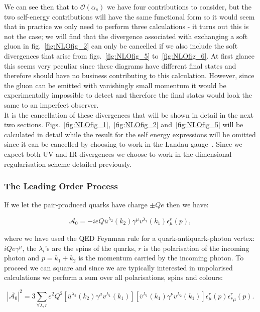 		We can see then that to $\mathcal{O}(\alpha_s)$ we have four contributions to consider, but the two self-energy contributions will have
		the same functional form so it would seem that in practice we only need to perform three calculations - it turns out this is not the
		case; we will find that the divergence associated with exchanging a soft gluon in fig.~\eqref{fig:NLOfig_2} can only be cancelled
		if we also include the soft divergences that arise from figs.~\eqref{fig:NLOfig_5} to~\eqref{fig:NLOfig_6}.  At first glance this
		seems very peculiar since these diagrams have different final states and therefore should have no business contributing to this
		calculation.  However, since the gluon can be emitted with vanishingly small momentum it would be experimentally impossible to
		detect and therefore the final states would look the same to an imperfect observer.\\It is the cancellation of these divergences
		that will be shown in detail in the next two sections.  Figs.~\eqref{fig:NLOfig_1},~\eqref{fig:NLOfig_2} and~\eqref{fig:NLOfig_5}
		will be calculated in detail while the result for the self energy expressions will be omitted since it can be cancelled by
		choosing to work in the Landau gauge~\cite{fieldBook}.  Since we expect both UV and IR divergences we choose to work in the dimensional
		regularisation scheme detailed previously.

		\subsubsection{The Leading Order Process}

			If we let the pair-produced quarks have charge $\pm Qe$ then we have:

			\begin{equation}
				\mathcal{A}_0 = -ieQ\overline{u}^{\lambda_2}(k_2)\gamma^\mu v^{\lambda_1}(k_1)\epsilon^r_\mu(p),
			\end{equation}

			where we have used the QED Feynman rule for a quark-antiquark-photon vertex: $iQe\gamma^\mu$, the $\lambda_i$'s are the
			spins of the quarks, $r$ is the polarisation of the incoming photon and $p = k_1 + k_2$ is the momentum carried by the
			incoming photon.  To proceed we can square and since we are typically interested in unpolarised calculations we perform
			a sum over all polarisations, spins and colours:

			\begin{equation}
				|\overline{\mathcal{A}_0}|^2 = 3\sum_{\forall\lambda, r}e^2Q^2[\overline{u}^{\lambda_2}(k_2)\gamma^\mu
				v^{\lambda_1}(k_1)][\overline{v}^{\lambda_1}(k_1)\gamma^\nu v^{\lambda_2}(k_1)]\epsilon^r_\mu(p)\epsilon^r_{*\mu}(p).
			\end{equation}

